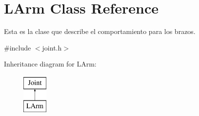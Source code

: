 \hypertarget{class_l_arm}{\section{L\-Arm Class Reference}
\label{class_l_arm}
}


Esta es la clase que describe el comportamiento para los brazos.  




{\ttfamily \#include $<$joint.\-h$>$}

Inheritance diagram for L\-Arm\-:\begin{figure}[H]
\begin{center}
\leavevmode
\includegraphics[height=2.000000cm]{class_l_arm}
\end{center}
\end{figure}
